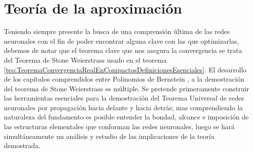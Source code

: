 
\chapter{Teoría de la aproximación}
 \label{chapter:teoria-aproximar}
Teniendo siempre presente la busca de una comprensión última de las redes neuronales
con el fin de poder encontrar alguna clave con las que optimizarlas, debemos de 
notar que el teorema clave que nos asegura la convergencia se trata del Teorema de Stone Weierstrass
usado en el teorema \ref{teo:TeoremaConvergenciaRealEnCompactosDefinicionesEsenciales}.
El desarrollo de los capítulos comprendidos entre Polinomios de Bernstein , 
a la demostración del teorema de Stone Weierstrass  es múltiple.
Se pretende primeramente construir las herramientas esenciales para la demostración del 
Teorema Universal de redes neuronales por propagación hacia delante y hacia detrás; 
mas comprendiendo la naturaleza del fundamento es posible entender la bondad, alcance e imposición
de las estructuras elementales que conforman las redes neuronales, luego se hará simultáneamente
un análisis y estudio de las implicaciones de la teoría demostrada. 




